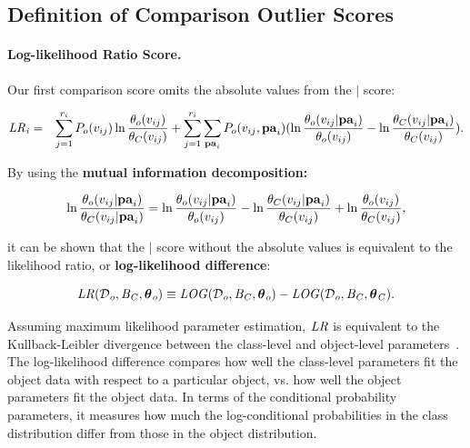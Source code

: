 {\subsection{Definition of Comparison Outlier Scores}

\paragraph{Log-likelihood Ratio Score.} Our first comparison score omits the absolute values from the $\mid$ score: 

\begin{eqnarray*}
\it{LR}_{i} & = & \sum_{j=1}^{r_{i}} P_{o}(v_{ij}) \ln \frac{\theta_{o}( v_{ij})}{\theta_{C}( v_{ij})}+ \sum_{j=1}^{r_{i}} \sum_{\mathbf{pa}_{i}} 
P_{o}( v_{ij},\mathbf{pa}_{i})
(\ln \frac{\theta_{o}( v_{ij}|\mathbf{pa}_{i})}{\theta_{o}(v_{ij})} - \ln \frac{\theta_{C}( v_{ij}|\mathbf{pa}_{i})}{\theta_{C}(v_{ij})}).
\end{eqnarray*}

By using the \textbf{mutual information decomposition:}


\begin{equation} \label{eq:decompose}
\ln \frac{\theta_{o}( v_{ij}|\mathbf{pa}_{i})}{\theta_{C}( v_{ij}|\mathbf{pa}_{i})} = \ln \frac{\theta_{o}(v_{ij}|\mathbf{pa}_{i})}{\theta_{o}(v_{ij})} - \ln \frac{\theta_{C}( v_{ij}|\mathbf{pa}_{i})}{\theta_{C}(v_{ij})} + \ln \frac{\theta_{o}( v_{ij})}{\theta_{C}( v_{ij})},
\end{equation}

\noindent it can be shown that the $\mid$ score without the absolute values is equivalent to 
the likelihood ratio, or {\bf log-likelihood difference}:

\begin{equation} \label{eq:log-diff}
\it{LR}(\mathcal{D}_{o},B_{C},\boldsymbol{\theta}_{o}) \equiv \it{LOG}(\mathcal{D}_{o},B_{C},\boldsymbol{\theta}_{o}) - \it{LOG}(\mathcal{D}_{o},B_{C},\boldsymbol{\theta}_{C}).
\end{equation}

Assuming maximum likelihood parameter estimation, $\it{LR}$ is equivalent to the Kullback-Leibler divergence between the class-level and object-level parameters~\citep{Campos2006}. The log-likelihood difference compares  how well the class-level parameters fit the object data with respect to a particular object, vs. how well the object parameters fit the object data. In terms of the conditional probability parameters, it measures how much the log-conditional probabilities in the class distribution differ from those in the object distribution. 
%
}
